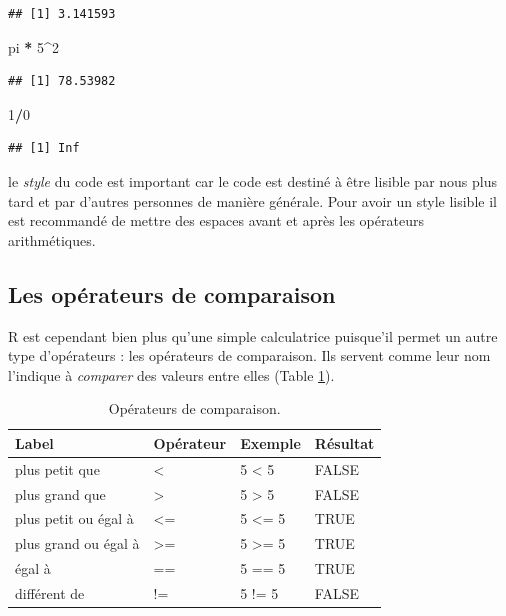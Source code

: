 \documentclass[]{book}
\newenvironment{Shaded}{\begin{snugshade}}{\end{snugshade}}
\newcommand{\DecValTok}[1]{\textcolor[rgb]{0.00,0.00,0.81}{#1}}
\newcommand{\NormalTok}[1]{#1}
\newcommand{\OperatorTok}[1]{\textcolor[rgb]{0.81,0.36,0.00}{\textbf{#1}}}
\newcommand{\StringTok}[1]{\textcolor[rgb]{0.31,0.60,0.02}{#1}}
\begin{document}
\begin{verbatim}
## [1] 3.141593
\end{verbatim}

\begin{Shaded}
\begin{Highlighting}[]
\NormalTok{pi }\OperatorTok{*}\StringTok{ }\DecValTok{5}\OperatorTok{^}\DecValTok{2}
\end{Highlighting}
\end{Shaded}

\begin{verbatim}
## [1] 78.53982
\end{verbatim}

\begin{Shaded}
\begin{Highlighting}[]
\DecValTok{1}\OperatorTok{/}\DecValTok{0}
\end{Highlighting}
\end{Shaded}

\begin{verbatim}
## [1] Inf
\end{verbatim}

le \emph{style} du code est important car le code est destiné à être lisible par nous plus tard et par d'autres personnes de manière générale. Pour avoir un style lisible il est recommandé de mettre des espaces avant et après les opérateurs arithmétiques.

\hypertarget{l011opcomp}{%
\subsection{Les opérateurs de comparaison}\label{l011opcomp}}

R est cependant bien plus qu'une simple calculatrice puisque'il permet un autre type d'opérateurs : les opérateurs de comparaison. Ils servent comme leur nom l'indique à \emph{comparer} des valeurs entre elles (Table \ref{tab:tabOpCom}).

\begin{table}[t]

\caption{\label{tab:tabOpCom}Opérateurs de comparaison.\label{tab:tabOpCom}}
\centering
\begin{tabular}{l|l|l|l}
\hline
Label & Opérateur & Exemple & Résultat\\
\hline
plus petit que & < & 5 < 5 & FALSE\\
\hline
plus grand que & > & 5 > 5 & FALSE\\
\hline
plus petit ou égal à & <= & 5 <= 5 & TRUE\\
\hline
plus grand ou égal à & >= & 5 >= 5 & TRUE\\
\hline
égal à & == & 5 == 5 & TRUE\\
\hline
différent de & != & 5 != 5 & FALSE\\
\hline
\end{tabular}
\end{table}
\end{document}

